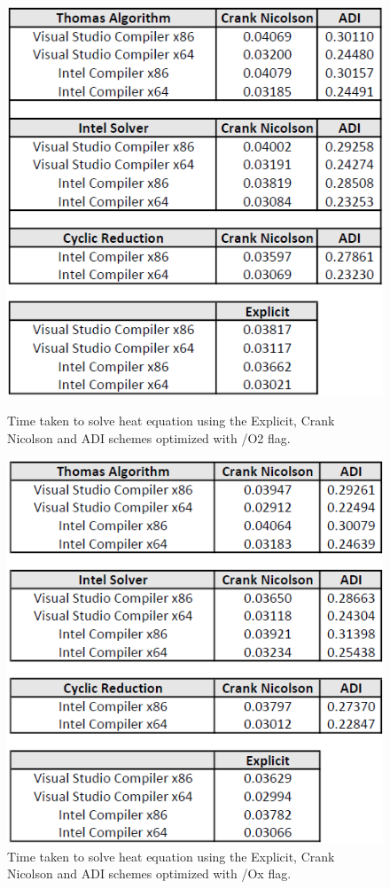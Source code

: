 \documentclass[12pt, oneside]{book}
\theoremstyle{plain}
\theoremstyle{definition}
\begin{document}
\begin{figure}[!htb]
  \begin{minipage}[b]{0.5\textwidth}
    \includegraphics[width=\textwidth]{heat2Optimized.png}
    \caption{Time taken to solve heat equation using the Explicit, Crank Nicolson and ADI schemes  optimized with /O2 flag.}
  \end{minipage}
  \begin{minipage}[b]{0.5\textwidth}
    \includegraphics[width=\textwidth]{heatXOptimized.png}
    \caption{Time taken to solve heat equation using the Explicit, Crank Nicolson and ADI schemes  optimized with /Ox flag.}
  \end{minipage}
\end{figure}
\end{document}
